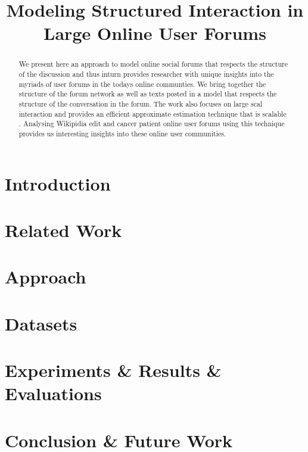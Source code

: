 \documentclass{article}
\title{Modeling Structured Interaction in \\ Large Online User Forums }
\newcommand{\comment}[1]{{\color{red}{#1}}}
\begin{document}
\maketitle
\begin{abstract}
We present here an approach to model online social forums that respects the
structure of the discussion and thus inturn provides researcher with unique
insights into the myriads of user forums in the todays online communties. We
bring together the structure of the forum network as well as texts posted
in a model that respects the structure of the conversation in the forum. The
work also focuses on large scal interaction and provides an efficient
approximate estimation technique that is scalable~\comment{i am thinking of
using stochastic variational for scalability if time permits} .
Analysing Wikipidia edit and cancer patient online user forums using this 
technique provides us interesting
insights into these online user communities.
\end{abstract}

\section{Introduction}


\section{Related Work}


\section{Approach}


\section{Datasets}

% 
% 
% 
\section{Experiments \& Results \& Evaluations}


\section{Conclusion \& Future Work}



%

%
%


\end{document}
